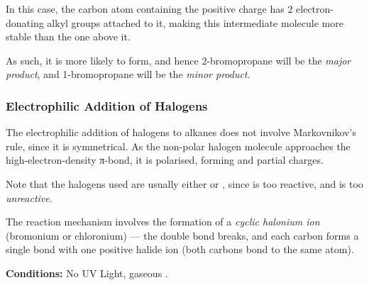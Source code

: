 
		In this case, the carbon atom containing the positive charge has 2 electron-donating alkyl groups attached to it,
		making this intermediate molecule more stable than the one above it.

		As such, it is more likely to form, and hence 2-bromopropane will be the \textit{major product}, and
		1-bromopropane will be the \textit{minor product}.



	\subsubsection{Electrophilic Addition of Halogens}

		The electrophilic addition of halogens to alkanes does not involve Markovnikov's rule, since it is symmetrical.
		As the non-polar halogen molecule approaches the high-electron-density π-bond, it is polarised, forming
		\deltap and \deltam partial charges.

		Note that the halogens used are usually either  or , since  is too reactive, and
		 is too \textit{unreactive}.

		The reaction mechanism involves the formation of a \textit{cyclic halonium ion} (bromonium or chloronium) –– the double
		bond breaks, and each carbon forms a single bond with one positive halide ion (both carbons bond to the same atom).

		\textbf{Conditions:} No UV Light, gaseous .

